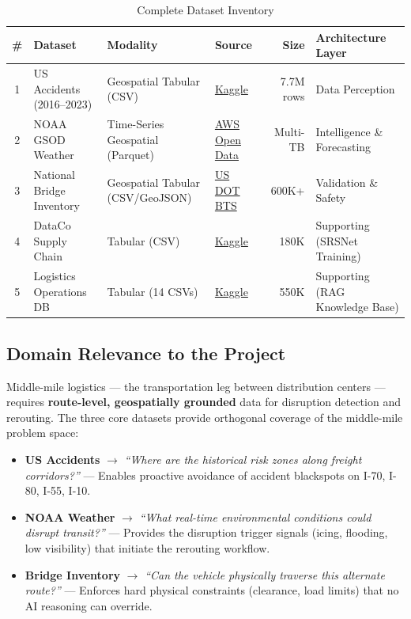 \documentclass[14.5pt,letterpaper]{article}
\begin{document}
\begin{table}[H]
\centering
\caption{Complete Dataset Inventory}
\small
\begin{tabularx}{\textwidth}{@{}c l l l r X@{}}
\toprule
\textbf{\#} & \textbf{Dataset} & \textbf{Modality} & \textbf{Source} & \textbf{Size} & \textbf{Architecture Layer} \\
\midrule
1 & US Accidents (2016--2023) & Geospatial Tabular (CSV) & \href{https://www.kaggle.com/datasets/sobhanmoosavi/us-accidents}{Kaggle} & 7.7M rows & Data Perception \\
2 & NOAA GSOD Weather & Time-Series Geospatial (Parquet) & \href{https://registry.opendata.aws/noaa-gsod/}{AWS Open Data} & Multi-TB & Intelligence \& Forecasting \\
3 & National Bridge Inventory & Geospatial Tabular (CSV/GeoJSON) & \href{https://geodata.bts.gov/datasets/national-bridge-inventory/}{US DOT BTS} & 600K+ & Validation \& Safety \\
4 & DataCo Supply Chain & Tabular (CSV) & \href{https://www.kaggle.com/datasets/shashwatwork/dataco-smart-supply-chain-for-big-data-analysis}{Kaggle} & 180K & Supporting (SRSNet Training) \\
5 & Logistics Operations DB & Tabular (14 CSVs) & \href{https://www.kaggle.com/datasets/yogape/logistics-operations-database}{Kaggle} & 550K & Supporting (RAG Knowledge Base) \\
\bottomrule
\end{tabularx}
\end{table}

\subsection{Domain Relevance to the Project}

Middle-mile logistics --- the transportation leg between distribution centers --- requires \textbf{route-level, geospatially grounded} data for disruption detection and rerouting. The three core datasets provide orthogonal coverage of the middle-mile problem space:

\begin{itemize}
    \item \textbf{US Accidents} $\rightarrow$ \textit{``Where are the historical risk zones along freight corridors?''} --- Enables proactive avoidance of accident blackspots on I-70, I-80, I-55, I-10.
    \item \textbf{NOAA Weather} $\rightarrow$ \textit{``What real-time environmental conditions could disrupt transit?''} --- Provides the disruption trigger signals (icing, flooding, low visibility) that initiate the rerouting workflow.
    \item \textbf{Bridge Inventory} $\rightarrow$ \textit{``Can the vehicle physically traverse this alternate route?''} --- Enforces hard physical constraints (clearance, load limits) that no AI reasoning can override.
\end{itemize}
\end{document}
